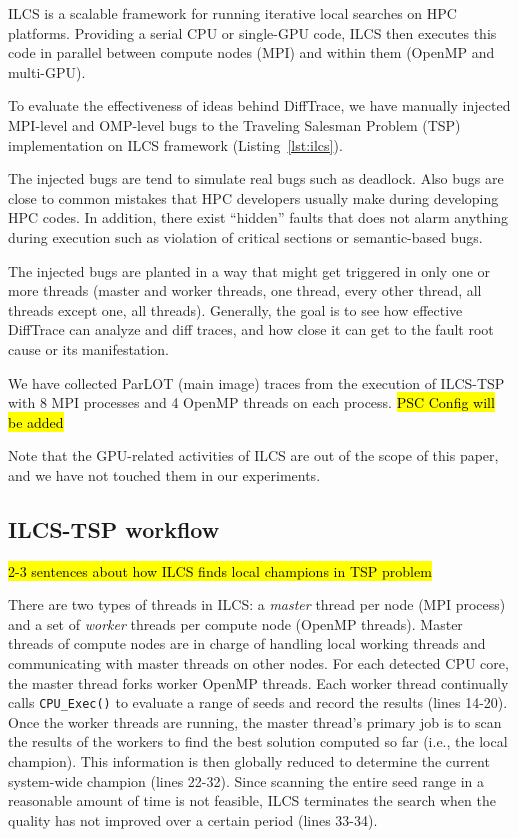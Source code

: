 
ILCS is a scalable framework for running iterative local searches on HPC platforms.
%
Providing a serial CPU or single-GPU code, ILCS then executes this code in parallel between compute nodes (MPI) and within them (OpenMP and multi-GPU).
%

To evaluate the effectiveness of ideas behind DiffTrace, we have manually injected MPI-level and OMP-level bugs to the Traveling Salesman Problem (TSP) implementation on ILCS framework (Listing~\ref{lst:ilcs}).
%

The injected bugs are tend to simulate real bugs such as deadlock.
%
Also bugs are close to common mistakes that HPC developers usually make during developing HPC codes. In addition, there exist ``hidden'' faults that does not alarm anything during execution such as violation of critical sections or semantic-based bugs. 
%



The injected bugs are planted in a way that might get triggered in only one or more threads (master and worker threads, one thread, every other thread, all threads except one, all threads). 
%
Generally, the goal is to see how effective DiffTrace can analyze and diff traces, and how close it can get to the fault root cause or its manifestation. 

%
We have collected ParLOT (main image) traces from the execution of ILCS-TSP with 8 MPI processes and 4 OpenMP threads on each process. \hl{PSC Config will be added}

Note that the GPU-related activities of ILCS are out of the scope of this paper, and we have not touched them in our experiments.
%


\subsection{ILCS-TSP workflow}

\hl{2-3 sentences about how ILCS finds local champions in TSP problem}

There are two types of threads in ILCS: a \textit{master} thread per node (MPI process) and a set of \textit{worker} threads per compute node (OpenMP threads).
%
Master threads of compute nodes are in charge of handling local working threads and communicating with master threads on other nodes.
%
For each detected CPU core, the master thread forks worker OpenMP threads.
%
Each worker thread continually calls
\texttt{CPU\_Exec()} to evaluate a range of seeds and record the results (lines 14-20).
%
Once the worker threads are running, the master thread's primary job is to scan the results of the workers to find the best solution computed so far (i.e., the local champion). This information is then globally reduced to determine the current system-wide champion (lines 22-32).
%
Since scanning the entire seed range in a reasonable amount of time is not feasible, ILCS terminates the search when the quality has not improved over a certain period (lines 33-34).

